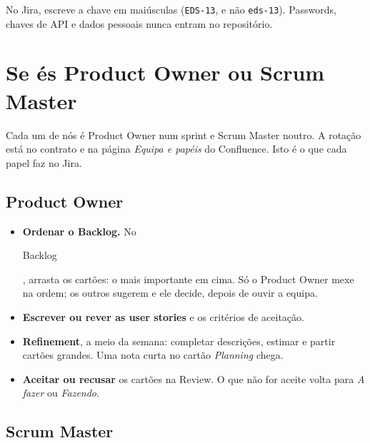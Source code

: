 \documentclass[11pt,a4paper]{article}
\newcommand{\btn}[1]{{\setlength{\fboxsep}{1.6pt}\colorbox{azulclaro}{\sffamily\small\strut #1}}}
\begin{document}
No Jira, escreve a chave em maiúsculas (\texttt{EDS-13}, e não \texttt{eds-13}). Passwords, chaves de API e dados pessoais nunca entram no repositório.

\section{Se és Product Owner ou Scrum Master}

Cada um de nós é Product Owner num sprint e Scrum Master noutro. A rotação está no contrato e na página \textit{Equipa e papéis} do Confluence. Isto é o que cada papel faz no Jira.

\subsection{Product Owner}

\begin{itemize}
  \item \textbf{Ordenar o Backlog.} No \btn{Backlog}, arrasta os cartões: o mais importante em cima. Só o Product Owner mexe na ordem; os outros sugerem e ele decide, depois de ouvir a equipa.
  \item \textbf{Escrever ou rever as user stories} e os critérios de aceitação.
  \item \textbf{Refinement}, a meio da semana: completar descrições, estimar e partir cartões grandes. Uma nota curta no cartão \textit{Planning} chega.
  \item \textbf{Aceitar ou recusar} os cartões na Review. O que não for aceite volta para \textit{A fazer} ou \textit{Fazendo}.
\end{itemize}

\subsection{Scrum Master}
\end{document}
